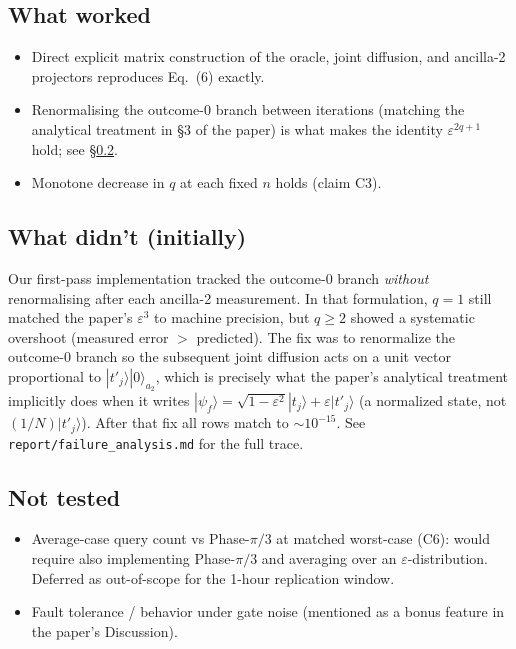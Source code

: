 \documentclass[11pt]{article}
\begin{document}
\subsection{What worked}
\begin{itemize}
  \item Direct explicit matrix construction of the oracle, joint diffusion, and
        ancilla-2 projectors reproduces Eq.~(6) exactly.
  \item Renormalising the outcome-0 branch between iterations (matching the
        analytical treatment in \S3 of the paper) is what makes the identity
        \(\varepsilon^{2q+1}\) hold; see \S\ref{sec:friction}.
  \item Monotone decrease in \(q\) at each fixed \(n\) holds (claim C3).
\end{itemize}

\subsection{What didn't (initially)}\label{sec:friction}
Our first-pass implementation tracked the outcome-0 branch \emph{without}
renormalising after each ancilla-2 measurement. In that formulation, \(q=1\)
still matched the paper's \(\varepsilon^3\) to machine precision, but
\(q\ge 2\) showed a systematic overshoot (measured error \(>\) predicted). The
fix was to renormalize the outcome-0 branch so the subsequent joint diffusion
acts on a unit vector proportional to \(|t'_j\rangle|0\rangle_{a_2}\), which is
precisely what the paper's analytical treatment implicitly does when it
writes \(|\psi_f\rangle = \sqrt{1-\varepsilon^2}|t_j\rangle + \varepsilon|t'_j\rangle\)
(a normalized state, not \((1/N)|t'_j\rangle\)). After that fix all rows
match to \(\sim 10^{-15}\). See \texttt{report/failure\_analysis.md} for the
full trace.

\subsection{Not tested}
\begin{itemize}
  \item Average-case query count vs Phase-\(\pi/3\) at matched worst-case (C6):
        would require also implementing Phase-\(\pi/3\) and averaging over an
        \(\varepsilon\)-distribution. Deferred as out-of-scope for the
        1-hour replication window.
  \item Fault tolerance / behavior under gate noise (mentioned as a bonus
        feature in the paper's Discussion).
\end{itemize}
\end{document}
